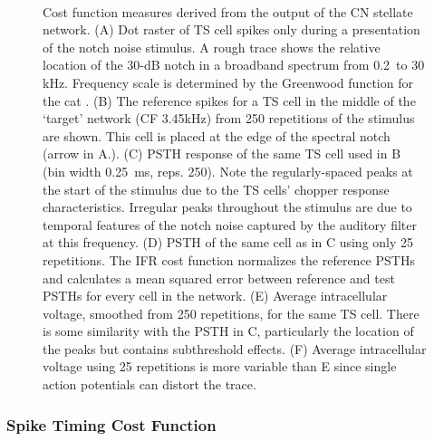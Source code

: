 \begin{figure}[pt!]
  \begin{center}
    \\
    \vspace{0.1in}
\end{center}
\caption{Cost function measures derived from the output of the CN
  stellate network. (A) Dot raster of TS cell spikes only during a
  presentation of the notch noise stimulus. A rough trace shows the
  relative location of the 30-dB notch in a broadband spectrum from
  0.2~to 30 kHz. Frequency scale is determined by the Greenwood
  function for the cat \citep{Greenwood:1990}. (B) The reference spikes
  for a TS cell in the middle of the `target' network (CF 3.45kHz)
  from 250 repetitions of the stimulus are shown. This cell is placed
  at the edge of the spectral notch (arrow in A.). (C) PSTH response
  of the same TS cell used in B (bin width 0.25~ms, reps. 250). Note
  the regularly-spaced peaks at the start of the stimulus due to the
  TS cells' chopper response characteristics. Irregular peaks
  throughout the stimulus are due to temporal features of the notch
  noise captured by the auditory filter at this frequency. (D) PSTH of
  the same cell as in C using only 25 repetitions. The IFR cost
  function normalizes the reference PSTHs and calculates a mean
  squared error between reference and test {PSTH}s for every cell in the
  network. (E) Average intracellular voltage, smoothed from 250
  repetitions, for the same TS cell. There is some similarity with the
  PSTH in C, particularly the location of the peaks but contains
  subthreshold effects. (F) Average intracellular voltage using 25
  repetitions is more variable than E since single action potentials
  can distort the trace.}
\label{fig:GA:Costfunctions}
\end{figure}
\clearpage

\subsubsection{Spike Timing Cost Function}\label{sec:GA:spike-timing-cost-fn}


